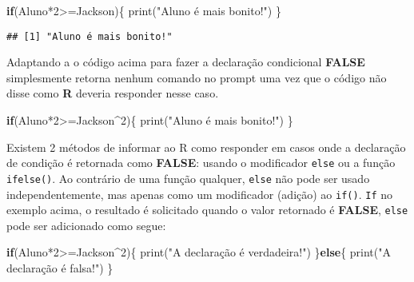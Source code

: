 \documentclass[
]{book}
\newenvironment{Shaded}{\begin{snugshade}}{\end{snugshade}}
\newcommand{\ControlFlowTok}[1]{\textcolor[rgb]{0.13,0.29,0.53}{\textbf{#1}}}
\newcommand{\DecValTok}[1]{\textcolor[rgb]{0.00,0.00,0.81}{#1}}
\newcommand{\FunctionTok}[1]{\textcolor[rgb]{0.00,0.00,0.00}{#1}}
\newcommand{\NormalTok}[1]{#1}
\newcommand{\SpecialCharTok}[1]{\textcolor[rgb]{0.00,0.00,0.00}{#1}}
\newcommand{\StringTok}[1]{\textcolor[rgb]{0.31,0.60,0.02}{#1}}
\begin{document}
\begin{Shaded}
\begin{Highlighting}[]
\ControlFlowTok{if}\NormalTok{(Aluno}\SpecialCharTok{*}\DecValTok{2}\SpecialCharTok{\textgreater{}=}\NormalTok{Jackson)\{}
  \FunctionTok{print}\NormalTok{(}\StringTok{"Aluno é mais bonito!"}\NormalTok{)}
\NormalTok{  \}}
\end{Highlighting}
\end{Shaded}

\begin{verbatim}
## [1] "Aluno é mais bonito!"
\end{verbatim}

Adaptando a o código acima para fazer a declaração condicional \textbf{FALSE} simplesmente retorna nenhum comando no prompt uma vez que o código não disse como \textbf{R} deveria responder nesse caso.

\begin{Shaded}
\begin{Highlighting}[]
\ControlFlowTok{if}\NormalTok{(Aluno}\SpecialCharTok{*}\DecValTok{2}\SpecialCharTok{\textgreater{}=}\NormalTok{Jackson}\SpecialCharTok{\^{}}\DecValTok{2}\NormalTok{)\{}
    \FunctionTok{print}\NormalTok{(}\StringTok{"Aluno é mais bonito!"}\NormalTok{)}
\NormalTok{  \}}
\end{Highlighting}
\end{Shaded}

Existem 2 métodos de informar ao R como responder em casos onde a declaração de condição é retornada como \textbf{FALSE}: usando o modificador \texttt{else} ou a função \texttt{ifelse()}.
Ao contrário de uma função qualquer, \texttt{else} não pode ser usado independentemente, mas apenas como um modificador (adição) ao \texttt{if()}. \texttt{If} no exemplo acima, o resultado é solicitado quando o valor retornado é \textbf{FALSE}, \texttt{else} pode ser adicionado como segue:

\begin{Shaded}
\begin{Highlighting}[]
\ControlFlowTok{if}\NormalTok{(Aluno}\SpecialCharTok{*}\DecValTok{2}\SpecialCharTok{\textgreater{}=}\NormalTok{Jackson}\SpecialCharTok{\^{}}\DecValTok{2}\NormalTok{)\{}
    \FunctionTok{print}\NormalTok{(}\StringTok{"A declaração é verdadeira!"}\NormalTok{)}
\NormalTok{  \}}\ControlFlowTok{else}\NormalTok{\{}
    \FunctionTok{print}\NormalTok{(}\StringTok{"A declaração é falsa!"}\NormalTok{)}
\NormalTok{    \}}
\end{Highlighting}
\end{Shaded}
\end{document}
